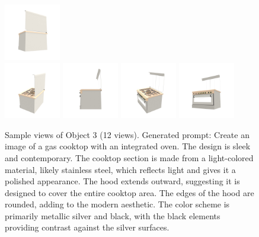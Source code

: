 \begin{figure}[htbp]
  \includegraphics[width=0.22\textwidth]{images/data/samples/obj3/007.jpeg}\\
  \includegraphics[width=0.22\textwidth]{images/data/samples/obj3/008.jpeg}\hfill
  \includegraphics[width=0.22\textwidth]{images/data/samples/obj3/009.jpeg}\hfill
  \includegraphics[width=0.22\textwidth]{images/data/samples/obj3/010.jpeg}\hfill
  \includegraphics[width=0.22\textwidth]{images/data/samples/obj3/011.jpeg}
  \caption{Sample views of Object 3 (12 views). Generated prompt: Create an image of a gas cooktop with an integrated oven. The design is sleek and contemporary. The cooktop section is made from a light-colored material, likely stainless steel, which reflects light and gives it a polished appearance. The hood extends outward, suggesting it is designed to cover the entire cooktop area. The edges of the hood are rounded, adding to the modern aesthetic. The color scheme is primarily metallic silver and black, with the black elements providing contrast against the silver surfaces.}
  \label{fig:dataset-sample-obj3}
\end{figure}
